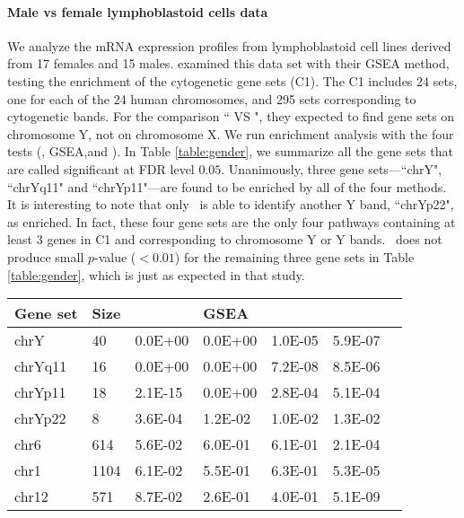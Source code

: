 	\paragraph{Male vs female lymphoblastoid cells data}
	We analyze the mRNA expression profiles from lymphoblastoid cell lines derived from 17 females 
	and	15 males. \citet{subramanian2005gene} examined this data set with their GSEA method, 
	testing the enrichment of the  cytogenetic gene sets (C1). The C1 includes 24 sets, one for 
	each of the 24 human chromosomes, and 295 sets corresponding to cytogenetic bands. For the 
	comparison `` VS ", they expected to find gene sets on chromosome Y, 
	not on chromosome X. We run enrichment analysis with the four tests (\OurMethod, GSEA,\CMT and 
	\genr). In Table \ref{table:gender}, we summarize all the gene sets that are called significant 
	at FDR level $0.05$. Unanimously, three gene sets---``chrY", ``chrYq11" and ``chrYp11"---are 
	found to be enriched by all of the four methods. It is interesting to note that only 
	\OurMethod~is able to identify another Y band, ``chrYp22", as enriched. In fact, these four 
	gene sets are the only four pathways containing at least 3 genes in  C1 and corresponding to 
	chromosome Y or Y bands. \OurMethod~does not produce small $p$-value ($<0.01$) for the 
	remaining three gene sets in Table \ref{table:gender}, which is just as expected in that study.
		
	\begin{table*}[!ht]
		\centering
		\caption[Enriched gene sets and their nominal $p$ values for lymphoblastoid cells 
		data]{Enriched gene sets and their nominal $p$ values for lymphoblastoid cells data. 
		Reported are gene sets with $\text{FDR}<0.05$ for at least one of the \OurMethod, GSEA, 
		\CMT~and \genr~methods using \FDR~(\FDRabb) procedure.}
		\begin{tabular}{p{2cm}p{1cm}p{2cm}p{2cm}p{3cm}p{2cm}p{0.5cm}} \hline
			Gene set & Size & \OurMethod & GSEA & \CMT & \genr \\ 		\hline
			chrY & 40 & 0.0E+00 & 0.0E+00 & 1.0E-05 & 5.9E-07 \\ 
			chrYq11 & 16 & 0.0E+00 & 0.0E+00 & 7.2E-08 & 8.5E-06 \\ 
			chrYp11 & 18 & 2.1E-15 & 0.0E+00 & 2.8E-04 & 5.1E-04 \\ 
			chrYp22 & 8 & 3.6E-04 & 1.2E-02 & 1.0E-02 & 1.3E-02 \\ 
			chr6 & 614 & 5.6E-02 & 6.0E-01 & 6.1E-01 & 2.1E-04 \\ 
			chr1 & 1104 & 6.1E-02 & 5.5E-01 & 6.3E-01 & 5.3E-05 \\ 
			chr12 & 571 & 8.7E-02 & 2.6E-01 & 4.0E-01 & 5.1E-09 \\ 
			\hline
		\end{tabular}
		\label{table:gender}
	\end{table*}
	
